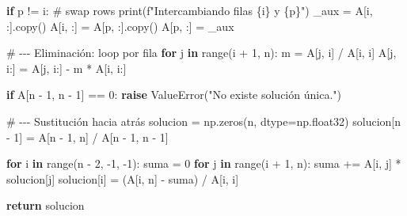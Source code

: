 \documentclass[
  letterpaper,
  DIV=11,
  numbers=noendperiod]{scrartcl}
\newenvironment{Shaded}{\begin{snugshade}}{\end{snugshade}}
\newcommand{\BuiltInTok}[1]{\textcolor[rgb]{0.00,0.23,0.31}{#1}}
\newcommand{\CommentTok}[1]{\textcolor[rgb]{0.37,0.37,0.37}{#1}}
\newcommand{\ControlFlowTok}[1]{\textcolor[rgb]{0.00,0.23,0.31}{\textbf{#1}}}
\newcommand{\DecValTok}[1]{\textcolor[rgb]{0.68,0.00,0.00}{#1}}
\newcommand{\KeywordTok}[1]{\textcolor[rgb]{0.00,0.23,0.31}{\textbf{#1}}}
\newcommand{\NormalTok}[1]{\textcolor[rgb]{0.00,0.23,0.31}{#1}}
\newcommand{\OperatorTok}[1]{\textcolor[rgb]{0.37,0.37,0.37}{#1}}
\newcommand{\PreprocessorTok}[1]{\textcolor[rgb]{0.68,0.00,0.00}{#1}}
\newcommand{\SpecialCharTok}[1]{\textcolor[rgb]{0.37,0.37,0.37}{#1}}
\newcommand{\SpecialStringTok}[1]{\textcolor[rgb]{0.13,0.47,0.30}{#1}}
\newcommand{\StringTok}[1]{\textcolor[rgb]{0.13,0.47,0.30}{#1}}
\begin{document}
\begin{Shaded}
\begin{Highlighting}[]
        \ControlFlowTok{if}\NormalTok{ p }\OperatorTok{!=}\NormalTok{ i:}
            \CommentTok{\# swap rows}
            \BuiltInTok{print}\NormalTok{(}\SpecialStringTok{f"Intercambiando filas }\SpecialCharTok{\{}\NormalTok{i}\SpecialCharTok{\}}\SpecialStringTok{ y }\SpecialCharTok{\{}\NormalTok{p}\SpecialCharTok{\}}\SpecialStringTok{"}\NormalTok{)}
\NormalTok{            \_aux }\OperatorTok{=}\NormalTok{ A[i, :].copy()}
\NormalTok{            A[i, :] }\OperatorTok{=}\NormalTok{ A[p, :].copy()}
\NormalTok{            A[p, :] }\OperatorTok{=}\NormalTok{ \_aux}

        \CommentTok{\# {-}{-}{-} Eliminación: loop por fila}
        \ControlFlowTok{for}\NormalTok{ j }\KeywordTok{in} \BuiltInTok{range}\NormalTok{(i }\OperatorTok{+} \DecValTok{1}\NormalTok{, n):}
\NormalTok{            m }\OperatorTok{=}\NormalTok{ A[j, i] }\OperatorTok{/}\NormalTok{ A[i, i]}
\NormalTok{            A[j, i:] }\OperatorTok{=}\NormalTok{ A[j, i:] }\OperatorTok{{-}}\NormalTok{ m }\OperatorTok{*}\NormalTok{ A[i, i:]}

    \ControlFlowTok{if}\NormalTok{ A[n }\OperatorTok{{-}} \DecValTok{1}\NormalTok{, n }\OperatorTok{{-}} \DecValTok{1}\NormalTok{] }\OperatorTok{==} \DecValTok{0}\NormalTok{:}
        \ControlFlowTok{raise} \PreprocessorTok{ValueError}\NormalTok{(}\StringTok{"No existe solución única."}\NormalTok{)}

    \CommentTok{\# {-}{-}{-} Sustitución hacia atrás}
\NormalTok{    solucion }\OperatorTok{=}\NormalTok{ np.zeros(n, dtype}\OperatorTok{=}\NormalTok{np.float32)}
\NormalTok{    solucion[n }\OperatorTok{{-}} \DecValTok{1}\NormalTok{] }\OperatorTok{=}\NormalTok{ A[n }\OperatorTok{{-}} \DecValTok{1}\NormalTok{, n] }\OperatorTok{/}\NormalTok{ A[n }\OperatorTok{{-}} \DecValTok{1}\NormalTok{, n }\OperatorTok{{-}} \DecValTok{1}\NormalTok{]}

    \ControlFlowTok{for}\NormalTok{ i }\KeywordTok{in} \BuiltInTok{range}\NormalTok{(n }\OperatorTok{{-}} \DecValTok{2}\NormalTok{, }\OperatorTok{{-}}\DecValTok{1}\NormalTok{, }\OperatorTok{{-}}\DecValTok{1}\NormalTok{):}
\NormalTok{        suma }\OperatorTok{=} \DecValTok{0}
        \ControlFlowTok{for}\NormalTok{ j }\KeywordTok{in} \BuiltInTok{range}\NormalTok{(i }\OperatorTok{+} \DecValTok{1}\NormalTok{, n):}
\NormalTok{            suma }\OperatorTok{+=}\NormalTok{ A[i, j] }\OperatorTok{*}\NormalTok{ solucion[j]}
\NormalTok{        solucion[i] }\OperatorTok{=}\NormalTok{ (A[i, n] }\OperatorTok{{-}}\NormalTok{ suma) }\OperatorTok{/}\NormalTok{ A[i, i]}

    \ControlFlowTok{return}\NormalTok{ solucion}
\end{Highlighting}
\end{Shaded}
\end{document}
